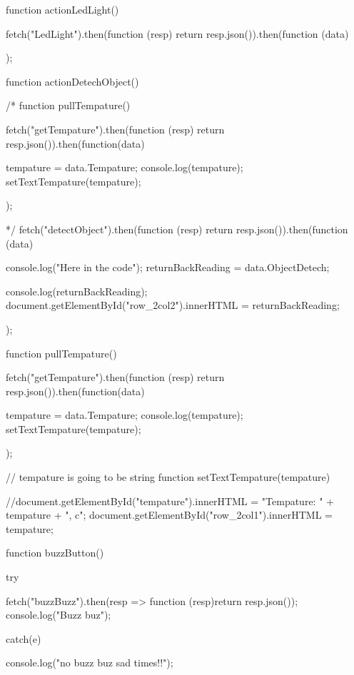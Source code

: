 	
	
	function actionLedLight() { 
			
			
			fetch("LedLight").then(function (resp) {return resp.json()}).then(function (data){
				
				
					
				
			});
		
		
	}
	
	
	
	function actionDetechObject() { 
		
		
		/*
		function pullTempature() { 
		
		
			fetch("getTempature").then(function (resp){ return resp.json()}).then(function(data) { 
				
				
				tempature = data.Tempature; 
				console.log(tempature); 
				setTextTempature(tempature);
				
				
			});
		
	}
		
		*/
		fetch("detectObject").then(function (resp) {return resp.json()}).then(function (data) {
			
			console.log("Here in the code");
			returnBackReading = data.ObjectDetech; 
			
			console.log(returnBackReading);
			document.getElementById("row_2col2").innerHTML = returnBackReading;
			
		} 
		
		
		
		
		);
		
		
	}
	
	function pullTempature() { 
		
		
			fetch("getTempature").then(function (resp){ return resp.json()}).then(function(data) { 
				
				
				tempature = data.Tempature; 
				console.log(tempature); 
				setTextTempature(tempature);
				
				
			});
		
	}
	
	// tempature is going to be string
	function setTextTempature(tempature){ 
		
		//document.getElementById("tempature").innerHTML = "Tempature: " +  tempature + ", c";
		document.getElementById("row_2col1").innerHTML = tempature;
		
	}
	
	
	

	
	
	
	
	function buzzButton(){ 
		
		try  { 
			
			
			fetch("buzzBuzz").then(resp => function (resp){return resp.json()});
			console.log("Buzz buz");
		}catch(e) { 
			
				console.log("no buzz buz sad times!!");
		}
	}
	
